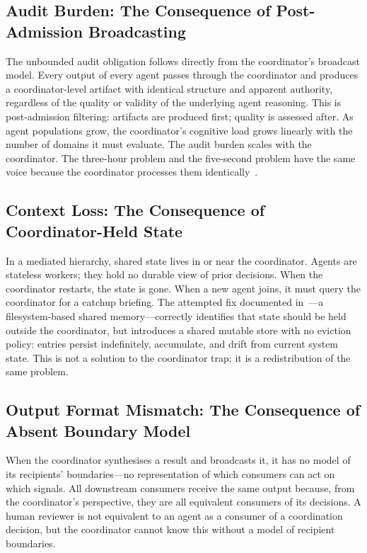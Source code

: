 \documentclass[11pt]{article}
\begin{document}
\subsection{Audit Burden: The Consequence of Post-Admission Broadcasting}

The unbounded audit obligation follows directly from the coordinator's broadcast
model. Every output of every agent passes through the coordinator and produces a
coordinator-level artifact with identical structure and apparent authority,
regardless of the quality or validity of the underlying agent reasoning. This is
post-admission filtering: artifacts are produced first; quality is assessed after.
As agent populations grow, the coordinator's cognitive load grows linearly with
the number of domains it must evaluate. The audit burden scales with the
coordinator. The three-hour problem and the five-second problem have the same
voice because the coordinator processes them identically~\cite{signal-noise}.

\subsection{Context Loss: The Consequence of Coordinator-Held State}

In a mediated hierarchy, shared state lives in or near the coordinator. Agents are
stateless workers; they hold no durable view of prior decisions. When the
coordinator restarts, the state is gone. When a new agent joins, it must query the
coordinator for a catchup briefing. The attempted fix documented
in~\cite{context-problem}---a filesystem-based shared memory---correctly identifies
that state should be held outside the coordinator, but introduces a shared mutable
store with no eviction policy: entries persist indefinitely, accumulate, and drift
from current system state. This is not a solution to the coordinator trap; it is a
redistribution of the same problem.

\subsection{Output Format Mismatch: The Consequence of Absent Boundary Model}

When the coordinator synthesises a result and broadcasts it, it has no model of
its recipients' boundaries---no representation of which consumers can act on which
signals. All downstream consumers receive the same output because, from the
coordinator's perspective, they are all equivalent consumers of its decisions. A
human reviewer is not equivalent to an agent as a consumer of a coordination
decision, but the coordinator cannot know this without a model of recipient
boundaries.
\end{document}
